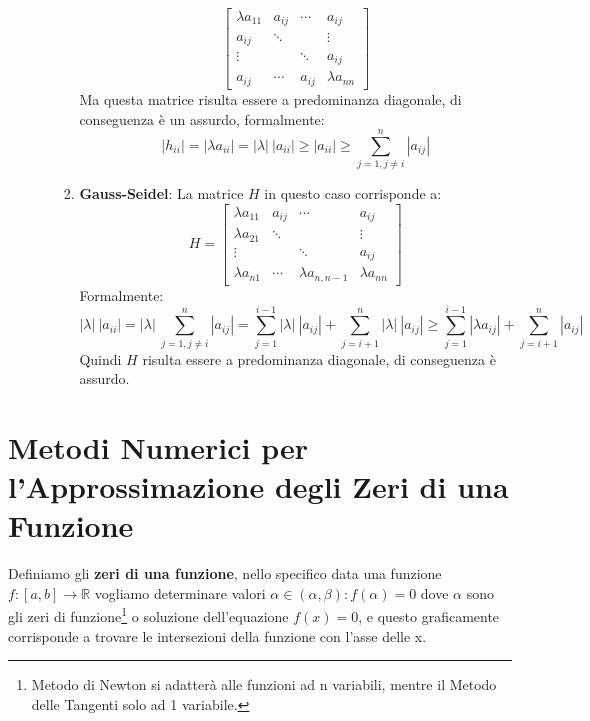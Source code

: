 \documentclass{article}
\begin{document}
\begin{enumerate}
\begin{enumerate}
\begin{enumerate}
\[\begin{bmatrix}
                \lambda a_{11} & a_{ij} & \cdots & a_{ij} \\
                a_{ij} & \ddots & & \vdots \\
                \vdots & & \ddots & a_{ij}\\
                a_{ij} & \cdots & a_{ij} & \lambda a_{nn}
            \end{bmatrix} \]
        Ma questa matrice risulta essere a predominanza diagonale, di conseguenza è un assurdo, formalmente:
        \[ |h_{ii}| = |\lambda a_{ii}| = |\lambda|\:|a_{ii}| \geq |a_{ii}| \geq \sum_{j=1, j \neq i}^{n} |a_{ij}| \]
            \item \textbf{Gauss-Seidel}: La matrice $H$ in questo caso corrisponde a:
            \[ H = \begin{bmatrix}
                \lambda a_{11} & a_{ij} & \cdots & a_{ij} \\
                \lambda a_{21} & \ddots & & \vdots \\
                \vdots & & \ddots & a_{ij}\\
                \lambda a_{n1} & \cdots & \lambda a_{n,n-1} & \lambda a_{nn}
            \end{bmatrix} \]
            Formalmente:
            \[ |\lambda|\:|a_{ii}| = |\lambda| \: \sum_{j=1, j \neq i}^{n} |a_{ij}| = \sum_{j=1}^{i-1} |\lambda| \: |a_{ij}| + \sum_{j=i+1}^{n} |\lambda| \: |a_{ij}| \geq \sum_{j=1}^{i-1} |\lambda a_{ij}| + \sum_{j=i+1}^{n} |a_{ij}| \]
            Quindi $H$ risulta essere a predominanza diagonale, di conseguenza è assurdo.
        \end{enumerate}
    \end{enumerate}
\end{enumerate}

\newpage

\section{Metodi Numerici per l'Approssimazione degli Zeri di una Funzione}

Definiamo gli \textbf{zeri di una funzione}, nello specifico data una funzione $f:[a,b] \rightarrow \mathbb{R}$ vogliamo determinare valori $\alpha \in (\alpha, \beta) : f(\alpha) = 0$ dove $\alpha$ sono gli zeri di funzione\footnote{Metodo di Newton si adatterà alle funzioni ad n variabili, mentre il Metodo delle Tangenti solo ad 1 variabile.} o soluzione dell'equazione $f(x)=0$, e questo graficamente corrisponde a trovare le intersezioni della funzione con l'asse delle x. 
\end{document}
